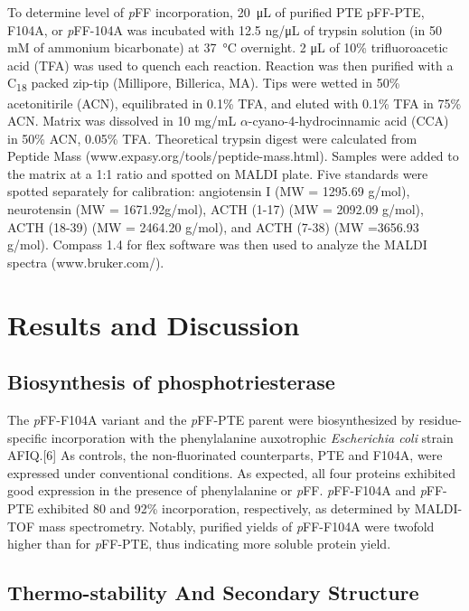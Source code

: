 \begin{refsection}
To determine level of \emph{p}FF incorporation, \SI{20}{\micro\liter} of
purified PTE pFF-PTE, F104A, or \emph{p}FF-104A was incubated with 12.5 ng/μL
of trypsin solution (in 50 mM of ammonium bicarbonate) at \SI{37}{\celsius}
overnight. 2 μL of 10\% trifluoroacetic acid (TFA) was used to quench each
reaction. Reaction was then purified with a C\textsubscript{18} packed zip-tip
(Millipore, Billerica, MA).  Tips were wetted in 50\% acetonitirile (ACN),
equilibrated in 0.1\% TFA, and eluted with 0.1\% TFA in 75\% ACN. Matrix was
dissolved in 10 mg/mL $\alpha$-cyano-4-hydrocinnamic acid (CCA) in 50\% ACN,
0.05\% TFA. Theoretical trypsin digest were calculated from Peptide Mass
(www.expasy.org/tools/peptide-mass.html). Samples were added to the matrix at a
1:1 ratio and spotted on MALDI plate. Five standards were spotted separately
for calibration: angiotensin I (MW = 1295.69 g/mol), neurotensin (MW =
1671.92g/mol), ACTH (1-17) (MW = 2092.09 g/mol), ACTH (18-39) (MW = 2464.20
g/mol), and ACTH (7-38) (MW =3656.93 g/mol). Compass 1.4 for flex software was
then used to analyze the MALDI spectra (www.bruker.com/).

\section{Results and Discussion}

\subsection{Biosynthesis of phosphotriesterase}

The \emph{p}FF-F104A variant and the \emph{p}FF-PTE parent were biosynthesized
by residue-specific incorporation with the phenylalanine auxotrophic
\emph{Escherichia coli} strain AFIQ.[6] As controls, the non-fluorinated
counterparts, PTE and F104A, were expressed under conventional conditions. As
expected, all four proteins exhibited good expression in the presence of
phenylalanine or \emph{p}FF. \emph{p}FF-F104A and \emph{p}FF-PTE exhibited 80
and 92\% incorporation, respectively, as determined by MALDI-TOF mass
spectrometry. Notably, purified yields of \emph{p}FF-F104A were twofold higher
than for \emph{p}FF-PTE, thus indicating more soluble protein yield.

\subsection{Thermo-stability And Secondary Structure}


\end{refsection}
